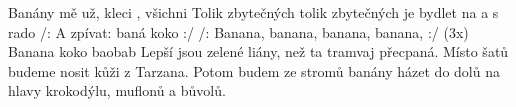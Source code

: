 \begin{TEXT}{Banány}
\SLOKA {} mě  už,   
 kleci ,  všichni   
Tolik zbytečných  
tolik zbytečných  
 je bydlet na  a  s rado
\REFREN /: A zpívat:   baná koko  :/ 
/: Banana, banana, banana, banana, :/ (3x) 
Banana koko baobab
\SLOKA Lepší jsou zelené liány, než ta tramvaj přecpaná.
Místo šatů budeme nosit kůži z Tarzana.
Potom budem ze stromů 
banány házet do dolů
na hlavy krokodýlu, muflonů a bůvolů.
\end{TEXT}